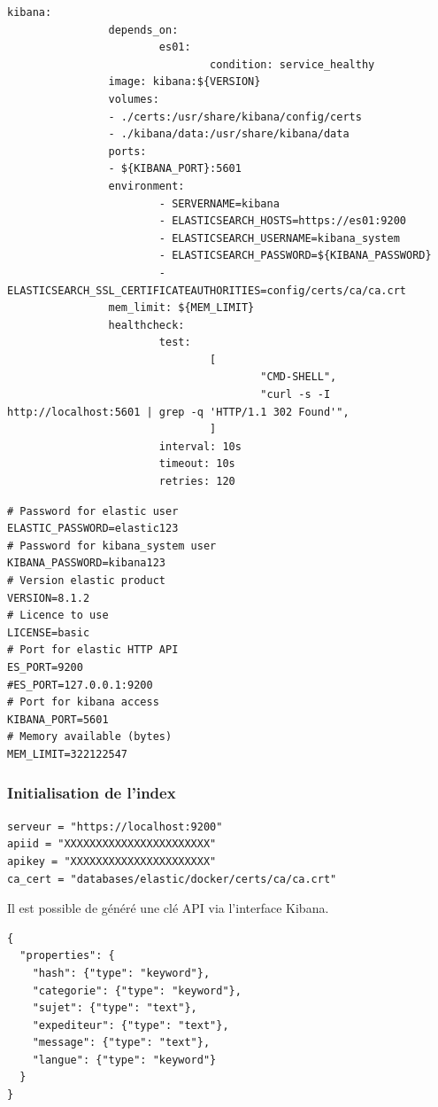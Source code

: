 \documentclass[a4paper,12pt]{article}
\begin{document}
\begin{lstlisting}[title=DockerCompose]
        kibana:
                depends_on:
                        es01:
                                condition: service_healthy
                image: kibana:${VERSION}
                volumes:
                - ./certs:/usr/share/kibana/config/certs
                - ./kibana/data:/usr/share/kibana/data
                ports:
                - ${KIBANA_PORT}:5601
                environment:
                        - SERVERNAME=kibana
                        - ELASTICSEARCH_HOSTS=https://es01:9200
                        - ELASTICSEARCH_USERNAME=kibana_system
                        - ELASTICSEARCH_PASSWORD=${KIBANA_PASSWORD}
                        - ELASTICSEARCH_SSL_CERTIFICATEAUTHORITIES=config/certs/ca/ca.crt
                mem_limit: ${MEM_LIMIT}
                healthcheck:
                        test:
                                [
                                        "CMD-SHELL",
                                        "curl -s -I http://localhost:5601 | grep -q 'HTTP/1.1 302 Found'",
                                ]
                        interval: 10s
                        timeout: 10s
                        retries: 120
			\end{lstlisting}
			
			\begin{lstlisting}[title=Fichier d'environnement]
# Password for elastic user
ELASTIC_PASSWORD=elastic123
# Password for kibana_system user
KIBANA_PASSWORD=kibana123
# Version elastic product
VERSION=8.1.2
# Licence to use
LICENSE=basic
# Port for elastic HTTP API
ES_PORT=9200
#ES_PORT=127.0.0.1:9200
# Port for kibana access
KIBANA_PORT=5601
# Memory available (bytes)
MEM_LIMIT=322122547
			\end{lstlisting}

		\subsubsection{Initialisation de l'index}
		
			\begin{lstlisting}[title=Exemples de secrets]
serveur = "https://localhost:9200"
apiid = "XXXXXXXXXXXXXXXXXXXXXXX"
apikey = "XXXXXXXXXXXXXXXXXXXXXX"
ca_cert = "databases/elastic/docker/certs/ca/ca.crt"
			\end{lstlisting}
			Il est possible de généré une clé API via l'interface Kibana.
			
			\begin{lstlisting}[title=Mapping]
{
  "properties": {
    "hash": {"type": "keyword"},
    "categorie": {"type": "keyword"},
    "sujet": {"type": "text"},
    "expediteur": {"type": "text"},
    "message": {"type": "text"},
    "langue": {"type": "keyword"}
  }
}
			\end{lstlisting}
			
\end{document}
